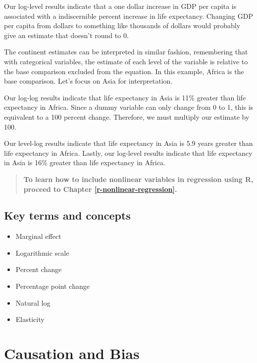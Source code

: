 \documentclass[
]{book}
\providecommand{\tightlist}{%
  \setlength{\itemsep}{0pt}\setlength{\parskip}{0pt}}
\begin{document}
Our log-level results indicate that a one dollar increase in GDP per capita is associated with a indiscernible percent increase in life expectancy. Changing GDP per capita from dollars to something like thousands of dollars would probably give an estimate that doesn't round to 0.

The continent estimates can be interpreted in similar fashion, remembering that with categorical variables, the estimate of each level of the variable is relative to the base comparison excluded from the equation. In this example, Africa is the base comparison. Let's focus on Asia for interpretation.

Our log-log results indicate that life expectancy in Asia is 11\% greater than life expectancy in Africa. Since a dummy variable can only change from 0 to 1, this is equivalent to a 100 percent change. Therefore, we must multiply our estimate by 100.

Our level-log results indicate that life expectancy in Asia is 5.9 years greater than life expectancy in Africa. Lastly, our log-level results indicate that life expectancy in Asia is 16\% greater than life expectancy in Africa.

\begin{quote}
\textbf{To learn how to include nonlinear variables in regression using R, proceed to Chapter \ref{r-nonlinear-regression}.}
\end{quote}

\hypertarget{kt8}{%
\section{Key terms and concepts}\label{kt8}}

\begin{itemize}
\tightlist
\item
  Marginal effect
\item
  Logarithmic scale
\item
  Percent change
\item
  Percentage point change
\item
  Natural log
\item
  Elasticity
\end{itemize}

\hypertarget{causation-and-bias}{%
\chapter{Causation and Bias}\label{causation-and-bias}}
\end{document}
